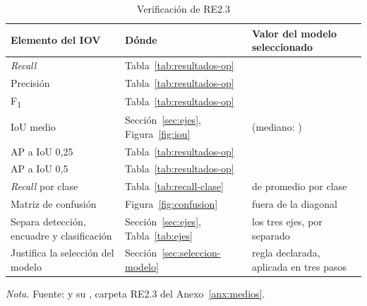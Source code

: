 \begin{table}[htbp]
    \centering
    \small
    \begin{threeparttable}
        \caption{Verificación de RE2.3}
        \label{tab:verificacion-re23}
        \begin{tabular}{@{}L{4.4cm}L{4.0cm}L{4.8cm}@{}}
            \toprule
            \textbf{Elemento del IOV} & \textbf{Dónde} & \textbf{Valor del modelo seleccionado} \\
            \midrule
            \textit{Recall} & Tabla~\ref{tab:resultados-op} & \rRecallYol{} \rRecallCiYol{} \\
            Precisión & Tabla~\ref{tab:resultados-op} & \rPrecisionYol{} \\
            F\textsubscript{1} & Tabla~\ref{tab:resultados-op} & \rFoneYol{} \\
            IoU medio & Sección~\ref{sec:ejes}, Figura~\ref{fig:iou} & \rIouMeanYol{} (mediano: \rIouYol{}) \\
            AP a IoU 0,25 & Tabla~\ref{tab:resultados-op} & \rMapLooseYol{} \\
            AP a IoU 0,5 & Tabla~\ref{tab:resultados-op} & \rMapStrictYol{} \\
            \textit{Recall} por clase & Tabla~\ref{tab:recall-clase} & \rMacroYol{} de promedio por clase \\
            Matriz de confusión & Figura~\ref{fig:confusion} & \rConfusionOff{} fuera de la diagonal \\
            Separa detección, encuadre y clasificación & Sección~\ref{sec:ejes}, Tabla~\ref{tab:ejes} & los tres ejes, por separado \\
            Justifica la selección del modelo & Sección~\ref{sec:seleccion-modelo} & regla declarada, aplicada en tres pasos \\
            \bottomrule
        \end{tabular}
        \begin{tablenotes}[flushleft]
            \footnotesize
            \item \textit{Nota.} Fuente:
             y su
            , carpeta RE2.3 del Anexo~\ref{anx:medios}.
        \end{tablenotes}
    \end{threeparttable}
\end{table}

